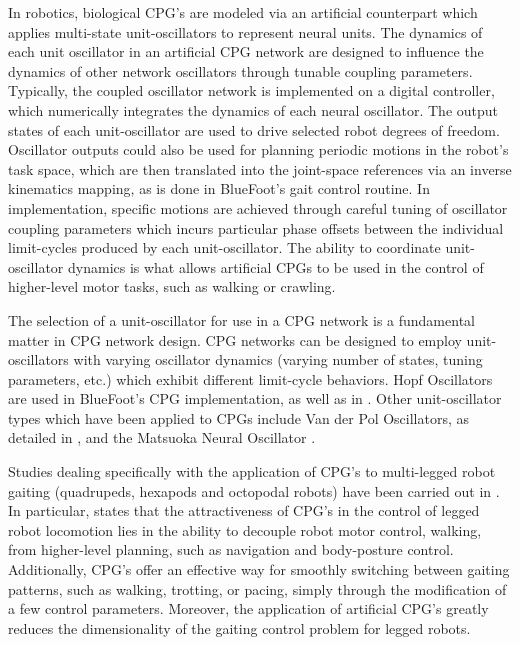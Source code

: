		In robotics, biological CPG's are modeled via an artificial counterpart which applies multi-state unit-oscillators to represent neural units. The dynamics of each unit oscillator in an artificial CPG network are designed to influence the dynamics of other network oscillators through tunable coupling parameters. Typically, the coupled oscillator network is implemented on a digital controller, which numerically integrates the dynamics of each neural oscillator. The output states of each unit-oscillator are used to drive selected robot degrees of freedom. Oscillator outputs could also be used for planning periodic motions in the robot's task space, which are then translated into the joint-space references via an inverse kinematics mapping, as is done in BlueFoot's gait control routine. In implementation, specific motions are achieved  through careful tuning of oscillator coupling parameters which incurs particular phase offsets between the individual limit-cycles produced by each unit-oscillator. The ability to coordinate unit-oscillator dynamics is what allows artificial CPGs to be used in the control of higher-level motor tasks, such as walking or crawling.

		The selection of a unit-oscillator for use in a CPG network is a fundamental matter in CPG network design. CPG networks can be designed to employ unit-oscillators with varying oscillator dynamics (\IE varying number of states, tuning parameters, etc.) which exhibit different limit-cycle behaviors. Hopf Oscillators are used in BlueFoot's CPG implementation, as well as in \cite{Righetti2006,Rutishauser2008,Matos2010}. Other unit-oscillator types which have been applied to CPGs include Van der Pol Oscillators, as detailed in \cite{Ijspeert2008}, and the Matsuoka Neural Oscillator \cite{Endo2004}.

		Studies dealing specifically with the application of CPG's to multi-legged robot gaiting (\IE quadrupeds, hexapods and octopodal robots) have been carried out in \cite{Arena2001,Klaassen2002,Arena2004,Inagaki2003,Inagaki2006,Billard2000,Brambilla2006,Buchli2006,Tsujita2001,Tsujita2004}.  In particular, \cite{Ijspeert2008} states that the attractiveness of CPG's in the control of legged robot locomotion lies in the ability to decouple robot motor control, \IE walking, from higher-level planning, such as navigation and body-posture control. Additionally, CPG's offer an effective way for smoothly switching between gaiting patterns, such as walking, trotting, or pacing, simply through the modification of a few control parameters. Moreover, the application of artificial CPG's greatly reduces the dimensionality of the gaiting control problem for legged robots.

